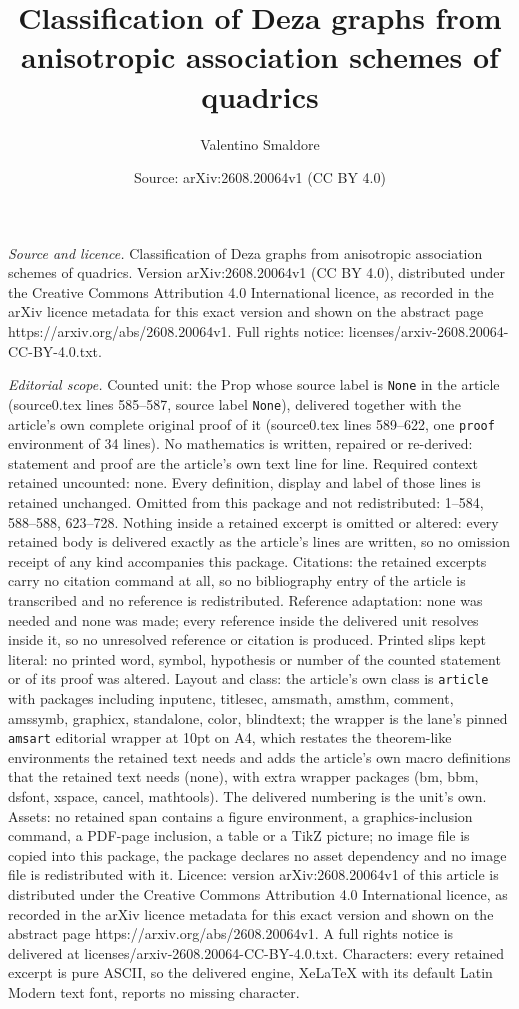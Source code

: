 \documentclass[10pt,a4paper]{amsart}
\title[Classification of Deza graphs from anisotropic association s]{Classification of Deza graphs from anisotropic association schemes of quadrics}
\author{Valentino Smaldore}
\date{Source: arXiv:2608.20064v1 (CC BY 4.0)}
\begin{document}
\maketitle

\noindent\emph{Source and licence.} Classification of Deza graphs from anisotropic association schemes of quadrics. Version arXiv:2608.20064v1 (CC BY 4.0), distributed under the Creative Commons Attribution 4.0 International licence, as recorded in the arXiv licence metadata for this exact version and shown on the abstract page https://arxiv.org/abs/2608.20064v1. Full rights notice: licenses/arxiv-2608.20064-CC-BY-4.0.txt.\par\smallskip

\noindent\textit{Editorial scope.} Counted unit: the Prop whose source label is \texttt{None} in the article (source0.tex lines 585--587, source label \texttt{None}), delivered together with the article's own complete original proof of it (source0.tex lines 589--622, one \texttt{proof} environment of 34 lines). No mathematics is written, repaired or re-derived: statement and proof are the article's own text line for line. Required context retained uncounted: none. Every definition, display and label of those lines is retained unchanged. Omitted from this package and not redistributed: 1--584, 588--588, 623--728. Nothing inside a retained excerpt is omitted or altered: every retained body is delivered exactly as the article's lines are written, so no omission receipt of any kind accompanies this package. Citations: the retained excerpts carry no citation command at all, so no bibliography entry of the article is transcribed and no reference is redistributed. Reference adaptation: none was needed and none was made; every reference inside the delivered unit resolves inside it, so no unresolved reference or citation is produced. Printed slips kept literal: no printed word, symbol, hypothesis or number of the counted statement or of its proof was altered. Layout and class: the article's own class is \texttt{article} with packages including inputenc, titlesec, amsmath, amsthm, comment, amssymb, graphicx, standalone, color, blindtext; the wrapper is the lane's pinned \texttt{amsart} editorial wrapper at 10pt on A4, which restates the theorem-like environments the retained text needs and adds the article's own macro definitions that the retained text needs (none), with extra wrapper packages (bm, bbm, dsfont, xspace, cancel, mathtools). The delivered numbering is the unit's own. Assets: no retained span contains a figure environment, a graphics-inclusion command, a PDF-page inclusion, a table or a TikZ picture; no image file is copied into this package, the package declares no asset dependency and no image file is redistributed with it. Licence: version arXiv:2608.20064v1 of this article is distributed under the Creative Commons Attribution 4.0 International licence, as recorded in the arXiv licence metadata for this exact version and shown on the abstract page https://arxiv.org/abs/2608.20064v1. A full rights notice is delivered at licenses/arxiv-2608.20064-CC-BY-4.0.txt. Characters: every retained excerpt is pure ASCII, so the delivered engine, XeLaTeX with its default Latin Modern text font, reports no missing character.
\end{document}

